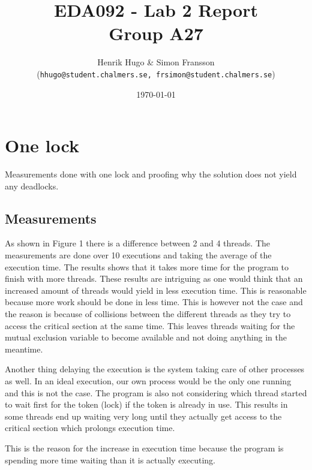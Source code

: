 \documentclass[a4paper,11pt,twoside,fleqn]{article}
\title{	
\normalfont \normalsize 
\huge EDA092 - Lab 2 Report \\ Group A27 \\ %
}
\author{Henrik Hugo \& Simon Fransson \\ (\texttt{hhugo@student.chalmers.se, frsimon@student.chalmers.se})} %
\date{\normalsize\today} %
\begin{document}
\maketitle %
\clearpage

\section{One lock}
Measurements done with one lock and proofing why the solution does not yield any deadlocks.
\subsection{Measurements}
As shown in Figure 1 there is a difference between 2 and 4 threads. The measurements are done over 10 executions and taking the average of the execution time. The results shows that it takes more time for the program to finish with more threads. These results are intriguing as one would think that an increased amount of threads would yield in less execution time. This is reasonable because more work should be done in less time. This is however not the case and the reason is because of collisions between the different threads as they try to access the critical section at the same time. This leaves threads waiting for the mutual exclusion variable to become available and not doing anything in the meantime. 

Another thing delaying the execution is the system taking care of other processes as well. In an ideal execution, our own process would be the only one running and this is not the case. The program is also not considering which thread started to wait first for the token (lock) if the token is already in use. This results in some threads end up waiting very long until they actually get access to the critical section which prolongs execution time.

This is the reason for the increase in execution time because the program is spending more time waiting than it is actually executing.
\end{document}
